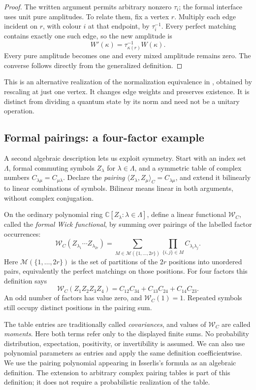 \documentclass[11pt]{article}
\theoremstyle{definition}
\theoremstyle{plain}
\numberwithin{equation}{section}
\begin{document}
\begin{proof}
The written argument permits arbitrary nonzero \(\tau_i\); the formal
interface uses unit pure amplitudes. To relate them, fix a vertex \(r\).
Multiply each edge incident on \(r\), with colour \(i\) at that endpoint,
by \(\tau_i^{-1}\). Every perfect matching contains exactly one such edge,
so the new amplitude is
\[
 W'(\kappa)=\tau_{\kappa(r)}^{-1}W(\kappa).
\]
Every pure amplitude becomes one and every mixed amplitude remains zero.
The converse follows directly from the generalized definition.
\end{proof}

This is an alternative realization of the normalization equivalence in
\cite[Lemma~14]{cgi}, obtained by rescaling at just one vertex. It changes
edge weights and preserves existence. It is distinct from dividing a quantum
state by its norm and need not be a unitary operation.

\subsection{Formal pairings: a four-factor example}\label{sec:pairings}

A second algebraic description lets us exploit symmetry. Start with an
index set \(\Lambda\), formal commuting symbols \(Z_\lambda\) for
\(\lambda\in\Lambda\), and a symmetric table of complex numbers
\(C_{\lambda\mu}=C_{\mu\lambda}\). Declare the \emph{pairing}
\(\langle Z_\lambda,Z_\mu\rangle_C=C_{\lambda\mu}\), and extend it
bilinearly to linear combinations of symbols. Bilinear means linear in
both arguments, without complex conjugation.

On the ordinary polynomial ring \(\mathbb C[Z_\lambda:\lambda\in\Lambda]\),
define a linear functional \(\mathcal W_C\), called the \emph{formal Wick
functional}, by summing over pairings of the labelled factor occurrences:
\[
 \mathcal W_C(Z_{\lambda_1}\cdots Z_{\lambda_{2r}})
 =\sum_{M\in\mathcal M(\{1,\ldots,2r\})}
       \prod_{\{i,j\}\in M}C_{\lambda_i\lambda_j}.
\]
Here \(\mathcal M(\{1,\ldots,2r\})\) is the set of partitions of the
\(2r\) positions into unordered pairs, equivalently the perfect matchings
on those positions. For four factors this definition says
\[
 \mathcal W_C(Z_1Z_2Z_3Z_4)
 =C_{12}C_{34}+C_{13}C_{24}+C_{14}C_{23}.
\]
An odd number of factors has value zero, and \(\mathcal W_C(1)=1\).
Repeated symbols still occupy distinct positions in the pairing sum.

The table entries are traditionally called \emph{covariances}, and values
of \(\mathcal W_C\) are called \emph{moments}. Here both terms refer only
to the displayed finite sums. No probability distribution, expectation,
positivity, or invertibility is assumed. We can also use polynomial
parameters as entries and apply the same definition coefficientwise.
We use the pairing polynomial appearing in Isserlis's formula
\cite[Section~2, equations~(5)--(6)]{isserlis} as an algebraic definition.
The extension to arbitrary complex pairing tables is part of this definition;
it does not require a probabilistic realization of the table.
\end{document}
